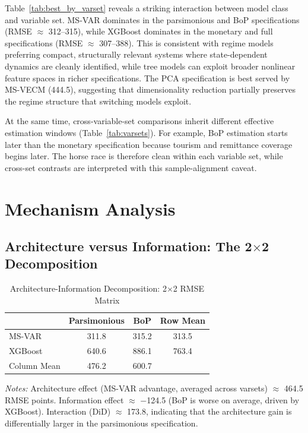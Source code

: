 \documentclass[12pt,a4paper]{article}
\begin{document}
Table~\ref{tab:best_by_varset} reveals a striking interaction between model class and variable set. MS-VAR dominates in the parsimonious and BoP specifications (RMSE $\approx$ 312--315), while XGBoost dominates in the monetary and full specifications (RMSE $\approx$ 307--388). This is consistent with regime models preferring compact, structurally relevant systems where state-dependent dynamics are cleanly identified, while tree models can exploit broader nonlinear feature spaces in richer specifications. The PCA specification is best served by MS-VECM (444.5), suggesting that dimensionality reduction partially preserves the regime structure that switching models exploit.

At the same time, cross-variable-set comparisons inherit different effective estimation windows (Table~\ref{tab:varsets}). For example, BoP estimation starts later than the monetary specification because tourism and remittance coverage begins later. The horse race is therefore clean within each variable set, while cross-set contrasts are interpreted with this sample-alignment caveat.

\section{Mechanism Analysis}
\label{sec:mechanism}

\subsection{Architecture versus Information: The 2$\times$2 Decomposition}

\begin{table}[htbp]
\centering
\caption{Architecture-Information Decomposition: 2$\times$2 RMSE Matrix}
\label{tab:did}
\begin{tabular}{lcc|c}
\toprule
& Parsimonious & BoP & Row Mean \\
\midrule
MS-VAR & 311.8 & 315.2 & 313.5 \\
XGBoost & 640.6 & 886.1 & 763.4 \\
\midrule
Column Mean & 476.2 & 600.7 & \\
\bottomrule
\end{tabular}
\begin{tablenotes}
\small
\item \textit{Notes:} Architecture effect (MS-VAR advantage, averaged across varsets) $\approx$ 464.5 RMSE points. Information effect $\approx$ $-$124.5 (BoP is worse on average, driven by XGBoost). Interaction (DiD) $\approx$ 173.8, indicating that the architecture gain is differentially larger in the parsimonious specification.
\end{tablenotes}
\end{table}
\end{document}
